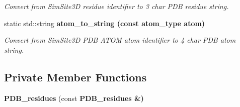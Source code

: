 \begin{CompactItemize}
\begin{CompactList}\small\item\em Convert from SimSite3D residue identifier to 3 char PDB residue string. \item\end{CompactList}\item 
static std::string \bf{atom\_\-to\_\-string} (const atom\_\-type atom)\label{classSimSite3D_1_1PDB__residues_7776d1c208963a0f70edc290f5317b9b}

\begin{CompactList}\small\item\em Convert from SimSite3D PDB ATOM atom identifier to 4 char PDB atom string. \item\end{CompactList}\end{CompactItemize}
\subsection*{Private Member Functions}
\begin{CompactItemize}
\item 
\textbf{PDB\_\-residues} (const \bf{PDB\_\-residues} \&)\label{classSimSite3D_1_1PDB__residues_6bfb18b097f98a13355953456193bccc}

\end{CompactItemize}
